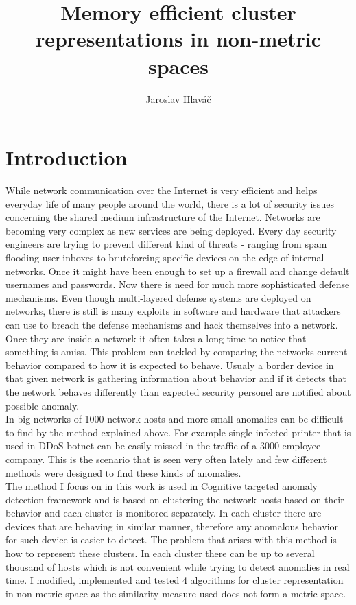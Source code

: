 \documentclass[thesis=B,english]{FITthesis}[2012/10/20]
\title{ Memory efficient cluster representations in non-metric spaces}
\author{Jaroslav Hlaváč} %
\begin{document}

\chapter{Introduction}

While network communication over the Internet is very efficient and helps everyday life of many people around the world, there is a lot of security issues concerning the shared medium infrastructure of the Internet.
Networks are becoming very complex as new services are being deployed.
Every day security engineers are trying to prevent different kind of threats - ranging from spam flooding user inboxes to bruteforcing specific devices on the edge of internal networks.
Once it might have been enough to set up a firewall and change default usernames and passwords.
Now there is need for much more sophisticated defense mechanisms.
Even though multi-layered defense systems are deployed on networks, there is still is many exploits in software and hardware that attackers can use to breach the defense mechanisms and hack themselves into a network.
Once they are inside a network it often takes a long time to notice that something is amiss.
This problem can tackled by comparing the networks current behavior compared to how it is expected to behave.
Usualy a border device in that given network is gathering information about behavior and if it detects that the network behaves differently than expected security personel are notified about possible anomaly. \\

In big networks of 1000 network hosts and more small anomalies can be difficult to find by the method explained above.
For example single infected printer that is used in DDoS botnet can be easily missed in the traffic of a 3000 employee company.
This is the scenario that is seen very often lately and few different methods were designed to find these kinds of anomalies. \\

The method I focus on in this work is used in Cognitive targeted anomaly detection framework and is based on clustering the network hosts based on their behavior and each cluster is monitored separately.
In each cluster there are devices that are behaving in similar manner, therefore any anomalous behavior for such device is easier to detect.
The problem that arises with this method is how to represent these clusters.
In each cluster there can be up to several thousand of hosts which is not convenient while trying to detect anomalies in real time.
I modified, implemented and tested 4 algorithms for cluster representation in non-metric space as the similarity measure used does not form a metric space.
\end{document}
